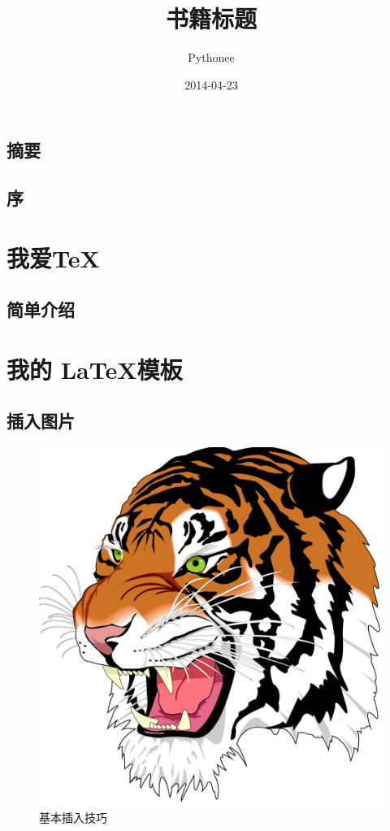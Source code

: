 \documentclass[fancyhdr,adobefonts,oneside,hyperref,openany,a4paper,UTF8]{ctexbook}
\author{Pythonee}
\title{书籍标题}
\date{2014-04-23}
\begin{document}
\maketitle


\frontmatter
{}	%
\tableofcontents
\listoftables
\listoffigures
\lstlistoflistings
\setcounter{page}{0}
\chapter{摘要}
\lipsum[1]
\chapter{序}
\lipsum[1]



\mainmatter
\part{我爱\TeX}
\chapter{简单介绍}
\lipsum

\part{我的 \LaTeX 模板}
\chapter{插入图片}

\begin{figure}[htp]
  \centering
    \includegraphics[scale=0.25]{img/tiger}
    \caption{基本插入技巧}
    \label{fig:tiger}
\end{figure}
\end{document}

